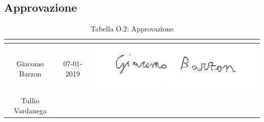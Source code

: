 \subsection{Approvazione}
\renewcommand{\arraystretch}{2}
\begin{table}[H]
\begin{center}
  \begin{tabular}{| c | c | c |}
    \hline
    \rowcolor{title_row}
    \textbf{\color{title_text}{Nominativo}} & \textbf{\color{title_text}{Data}} & \textbf{\color{title_text}{Firma}} \\ \hline
    Giacomo Barzon & 07-01-2019 & \includegraphics[align=c,scale=1]{Res/Firme/giacomo.png} \\ \hline
    Tullio Vardanega &  &  \\
    \hline
  \end{tabular}
  \caption{Tabella O.2: Approvazione\label{}}
\end{center}
\end{table}
\renewcommand{\arraystretch}{1}

